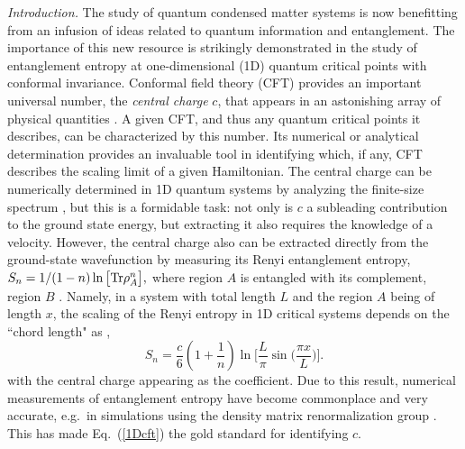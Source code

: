 \documentclass[prl,aps,twocolumn,floatfix,amsmath,amssymb,superscriptaddress,tightenlines]{revtex4}
\begin{document}
{\it Introduction.} 
The study of quantum condensed matter systems
 is now benefitting from an infusion of ideas related to quantum information and entanglement. The importance of this new resource is strikingly 
demonstrated in the study of entanglement entropy at one-dimensional (1D) quantum critical points with conformal invariance. Conformal field theory (CFT) provides an important
universal number, the {\it central charge} $c$, that appears in an astonishing array of physical
quantities \cite{Cardyubiquitous}. A given CFT, and
thus any quantum critical points it describes, can be
characterized by this number.
Its numerical or analytical determination provides an invaluable tool in identifying which, if any, CFT describes the scaling limit of a given Hamiltonian. 
The central charge can be numerically determined in 1D quantum systems by analyzing the finite-size spectrum \cite{BCN,Affleck}, but this is a formidable task: not only is $c$ a subleading contribution to the ground state energy, but extracting it also requires the knowledge of a velocity.
%
However,  the central charge also can be extracted 
directly from the ground-state wavefunction by measuring its Renyi
entanglement entropy, $ S_n = 1/(1-n) \ln \big[ {\rm Tr} \rho_A^n
\big], $ where region $A$ is entangled with its complement, region
$B$ \cite{Holzhey, VidalC}. Namely, in a system with total length $L$ and the region $A$ being of length $x$, the scaling of the Renyi entropy in 1D critical systems depends on the ``chord length" as \cite{Holzhey,Korepin,Cardy},
%
\begin{equation}
S_n = \frac{c}{6}\left({1+ \frac{1}{n} }\right) \ln\Big[ \frac{L}{\pi} \sin\big( \frac{\pi x}{L} \big) \Big]. \label{1Dcft}
\end{equation}
with the central charge appearing as the coefficient.
Due to this result, numerical measurements of entanglement entropy have become commonplace and 
very accurate, e.g.\ in simulations using the density matrix renormalization group \cite{White92,Scholl05}. This has made
Eq.~(\ref{1Dcft}) the gold standard for identifying $c$.
\end{document}
